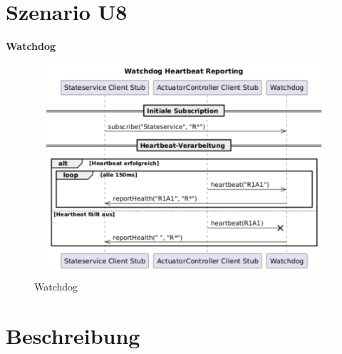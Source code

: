\section{Szenario U8}
\textbf{Watchdog}\\
\begin{figure}[h!]
	\centering
	\includegraphics[width=0.8\linewidth]{diagrams/watchdog_16_07.png}
	\caption{Watchdog}
	\label{fig:Watchdog}
\end{figure}














\section*{Beschreibung}



